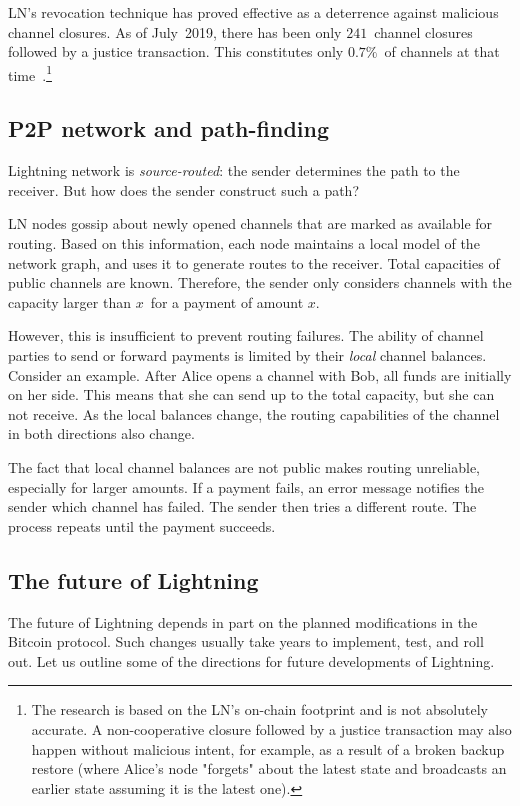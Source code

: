 LN's revocation technique has proved effective as a deterrence against malicious channel closures.
As of July~2019, there has been only $241$~channel closures followed by a justice transaction.
This constitutes only $0.7\%$~of channels at that time~\cite{BitMEXLN3}.\footnote{The research is based on the LN's on-chain footprint and is not absolutely accurate. A non-cooperative closure followed by a justice transaction may also happen without malicious intent, for example, as a result of a broken backup restore (where Alice's node "forgets" about the latest state and broadcasts an earlier state assuming it is the latest one).}


\subsection{P2P network and path-finding}

Lightning network is \textit{source-routed}: the sender determines the path to the receiver.
But how does the sender construct such a path?

LN nodes gossip about newly opened channels that are marked as available for routing.
Based on this information, each node maintains a local model of the network graph, and uses it to generate routes to the receiver.
Total capacities of public channels are known.
Therefore, the sender only considers channels with the capacity larger than $x$~for a payment of amount $x$.

However, this is insufficient to prevent routing failures.
The ability of channel parties to send or forward payments is limited by their \textit{local} channel balances.
Consider an example.
After Alice opens a channel with Bob, all funds are initially on her side.
This means that she can send up to the total capacity, but she can not receive.
As the local balances change, the routing capabilities of the channel in both directions also change.

The fact that local channel balances are not public makes routing unreliable, especially for larger amounts.
If a payment fails, an error message notifies the sender which channel has failed.
The sender then tries a different route.
The process repeats until the payment succeeds.


\subsection{The future of Lightning}

The future of Lightning depends in part on the planned modifications in the Bitcoin protocol.
Such changes usually take years to implement, test, and roll out.
Let us outline some of the directions for future developments of Lightning.

